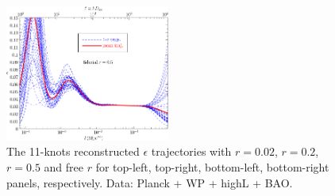 \documentclass[a4paper,11pt]{article}
\def \halffigwidth{0.48\textwidth}
\begin{document}
\begin{figure}
  \includegraphics[width=\halffigwidth]{nobicep_spline0_p11_r0d5_eps_traj.pdf}
  \caption{The 11-knots reconstructed $\epsilon$ trajectories with $r = 0.02$, $r=0.2$, $r=0.5$ and free $r$ for top-left, top-right, bottom-left, bottom-right panels, respectively. Data: Planck + WP + highL + BAO. \label{fig:traj_eps}}
\end{figure}
\end{document}
